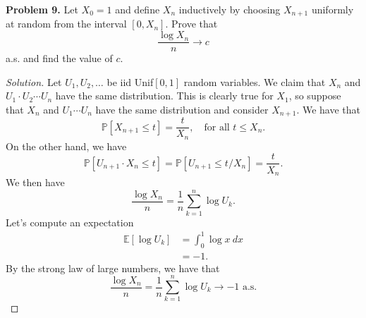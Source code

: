 \documentclass[11pt,letterpaper]{report}
\newcommand{\E}{\mathbb{E}}
\newcommand{\Prob}{\mathbb{P}}
\newenvironment{solution}
{\begin{proof}[Solution]}
{\end{proof}}
\begin{document}
\noindent\textbf{Problem 9. }
Let $X_0 = 1$ and define $X_n$ inductively by choosing $X_{n+1}$ uniformly at random from the interval $[0, X_n]$. Prove that
\[
\frac{\log X_n}{n}\to c
\]
a.s. and find the value of $c$.
\begin{solution}
	Let $U_1, U_2, \ldots$ be iid Unif$[0,1]$ random variables. We claim that $X_n$ and $U_1\cdot U_2\cdots U_n$ have the same distribution. This is clearly true for $X_1$, so suppose that $X_n$ and $U_1 \cdots U_n$ have the same distribution and consider $X_{n+1}$. We have that
	\[
	\Prob[X_{n+1} \leq t] = \frac{t}{X_n},\quad\text{for all }t\leq X_n.
	\]
	On the other hand, we have
	\[
	\Prob[U_{n+1}\cdot X_n \leq t] = \Prob[U_{n+1}\leq t/X_n] = \frac{t}{X_n}.
	\]
	We then have
	\[
	\frac{\log X_n}{n} = \frac{1}{n}\sum_{k=1}^n\log U_k.
	\]
	Let's compute an expectation
	\begin{align*}
		\E[\log U_k] &= \int_0^1 \log x\ dx\\
		&= -1.
	\end{align*}
	By the strong law of large numbers, we have that
	\[
	\frac{\log X_n}{n} = \frac{1}{n}\sum_{k=1}^n\log U_k \to -1\text{ a.s.}
	\]
\end{solution}
\end{document}
